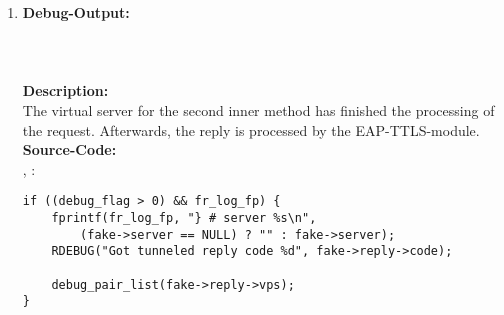 \begin{enumerate}
\item \textbf{Debug-Output:}\\
\\
\\
\\
\newline
\textbf{Description:}\\
The virtual server for the second inner method has finished the processing of the request. Afterwards, the reply is processed by the EAP-TTLS-module.\\
\newline
\textbf{Source-Code:}\\
, :
\begin{lstlisting}
if ((debug_flag > 0) && fr_log_fp) {
	fprintf(fr_log_fp, "} # server %s\n",
		(fake->server == NULL) ? "" : fake->server);
	RDEBUG("Got tunneled reply code %d", fake->reply->code);

	debug_pair_list(fake->reply->vps);
}
\end{lstlisting}
\end{enumerate}

\newpage



